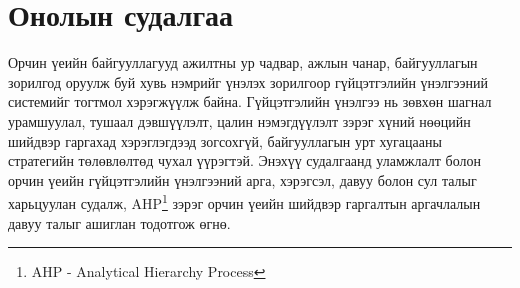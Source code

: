 \section{Онолын судалгаа}

Орчин үеийн байгууллагууд ажилтны ур чадвар, ажлын чанар, байгууллагын зорилгод оруулж буй 
хувь нэмрийг үнэлэх зорилгоор гүйцэтгэлийн үнэлгээний системийг тогтмол хэрэгжүүлж байна. 
Гүйцэтгэлийн үнэлгээ нь зөвхөн шагнал урамшуулал, тушаал дэвшүүлэлт, цалин нэмэгдүүлэлт зэрэг 
хүний нөөцийн шийдвэр гаргахад хэрэглэгдээд зогсохгүй, байгууллагын урт хугацааны стратегийн 
төлөвлөлтөд чухал үүрэгтэй. Энэхүү судалгаанд уламжлалт болон орчин үеийн гүйцэтгэлийн үнэлгээний 
арга, хэрэгсэл, давуу болон сул талыг харьцуулан судалж, AHP\footnote{AHP - Analytical Hierarchy Process} 
зэрэг орчин үеийн шийдвэр гаргалтын аргачлалын давуу талыг ашиглан тодотгож өгнө.



